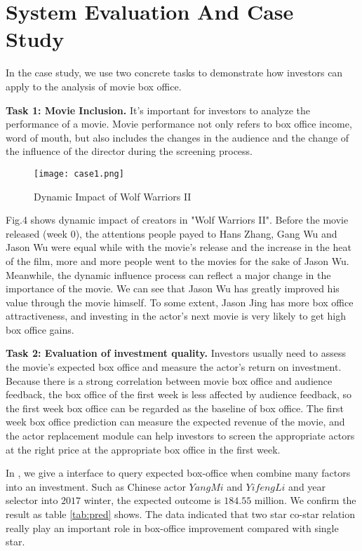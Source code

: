 \section{System Evaluation And Case Study}
\label{sec:evo}
\par  In the case study, we use two concrete tasks to demonstrate how investors can apply \system to the analysis of movie box office.
\par \textbf{Task 1: Movie Inclusion.} It's important for investors to analyze the performance of a movie. Movie performance not only refers to box office income, word of mouth, but also includes the changes in the audience and the change of the influence of the director during the screening process.

\begin{figure}[!htbp]
\centering
\texttt{[image: case1.png]}
\caption{Dynamic Impact of Wolf Warriors II}
\label{fig:case1}
\end{figure}

\par Fig.4 shows dynamic impact of creators in "Wolf Warriors II". Before the movie released (week 0), the attentions people payed to Hans Zhang, Gang Wu and Jason Wu were equal while with the movie's release and the increase in the heat of the film, more and more people went to the movies for the sake of Jason Wu. Meanwhile, the dynamic influence process can reflect a major change in the importance of the movie. We can see that Jason Wu has greatly improved his value through the movie himself. To some extent, Jason Jing has more box office attractiveness, and investing in the actor's next movie is very likely to get high box office gains.

\par \textbf{Task 2: Evaluation of investment quality.} Investors usually need to assess the movie's expected box office and measure the actor's return on investment. Because there is a strong correlation between movie box office and audience feedback, the box office of the first week is less affected by audience feedback, so the first week box office can be regarded as the baseline of box office. The first week box office prediction can measure the expected revenue of the movie, and the actor replacement module can help investors to screen the appropriate actors at the right price at the appropriate box office in the first week.

\par In \system, we give a interface to query expected box-office when combine many factors into an investment. Such as Chinese actor $ YangMi$ and $YifengLi$ and year selector into $2017$ winter, the expected outcome is $184.55$ million. We confirm the result as table \ref{tab:pred} shows. The data indicated that two star co-star relation really play an important role in box-office improvement compared with single star.

